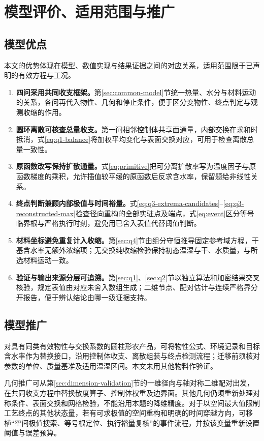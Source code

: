 \section{模型评价、适用范围与推广}
\subsection{模型优点}
本文的优势体现在模型、数值实现与结果证据之间的对应关系，适用范围限于已声明的有效方程与工况。
\begin{enumerate}
\item \textbf{四问采用共同收支框架。}第\ref{sec:common-model}节统一热量、水分与材料运动的关系，各问再代入物性、几何和停止条件，便于区分变物性、终点判定与观测收缩的作用。
\item \textbf{圆环离散可核查总量收支。}第一问相邻控制体共享面通量，内部交换在求和时抵消，式\eqref{eq:q1-balance}将加权平均变化与表面交换对应，可用于检查离散总量一致性。
\item \textbf{原函数改写保持扩散通量。}式\eqref{eq:primitive}把可分离扩散率写为温度因子与原函数梯度的乘积，允许插值较平缓的原函数后反求含水率，保留题给非线性关系。
\item \textbf{终点判断兼顾内部极值与时间裕量。}式\eqref{eq:q3-extrema-candidates}--\eqref{eq:q3-reconstructed-max}检查径向重构的全部实驻点及端点，式\eqref{eq:event}区分等号临界根与严格执行时刻，避免用已舍入表值代替阈值判断。
\item \textbf{材料坐标避免重复计入收缩。}第\ref{sec:q4}节由组分守恒推导固定参考域方程，干基含水率无额外浓缩项；无交换纯收缩检验保持初态温湿与干、水质量，与所选材料运动一致。
\item \textbf{验证与输出来源分层可追溯。}第\ref{sec:q1}、\ref{sec:q2}节以独立算法和加密结果交叉核验，规定表值由对应未舍入数组生成；二维节点、配对估计与连续严格界分开报告，便于辨认结论由哪一级证据支持。
\end{enumerate}

\subsection{模型推广}
\label{sec:model-extension}
对具有同类有效物性与交换系数的圆柱形农产品，可将物性公式、环境记录和目标含水率作为替换接口，沿用控制体收支、离散组装与终点检测流程；迁移前须核对参数的单位、质量基准及适用温湿区间。本文未用其他物料作验证。

几何推广可从第\ref{sec:dimension-validation}节的一维径向与轴对称二维配对出发，在共同收支方程中替换散度算子、控制体权重及边界面。其他几何仍须重新处理对称条件、表面交换和网格检验，不能沿用本题的降维精度。对于以空间最大值限制工艺终点的其他状态量，若有可求极值的空间重构和明确的时间穿越方向，可移植“空间极值搜索、等号根定位、执行裕量复核”的事件流程，并按该变量重新设置阈值与误差预算。

